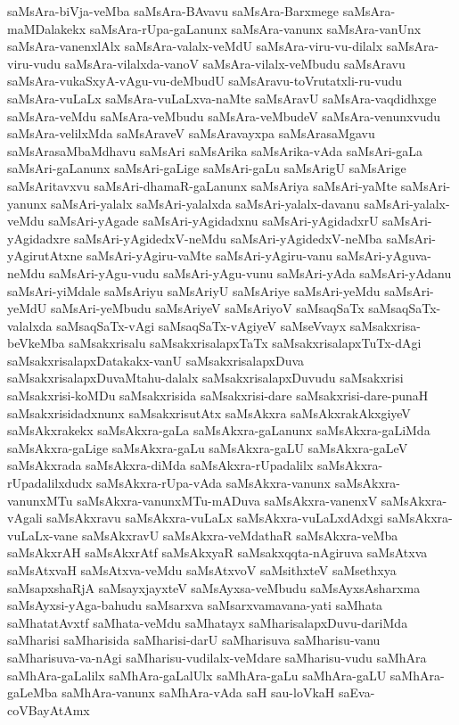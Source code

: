 {saMsAra-biVja-veMba
saMsAra-BAvavu
saMsAra-Barxmege
saMsAra-maMDalakekx
saMsAra-rUpa-gaLanunx
saMsAra-vanunx
saMsAra-vanUnx
saMsAra-vanenxlAlx
saMsAra-valalx-veMdU
saMsAra-viru-vu-dilalx
saMsAra-viru-vudu
saMsAra-vilalxda-vanoV
saMsAra-vilalx-veMbudu
saMsAravu
saMsAra-vukaSxyA-vAgu-vu-deMbudU
saMsAravu-toVrutatxli-ru-vudu
saMsAra-vuLaLx
saMsAra-vuLaLxva-naMte
saMsAravU
saMsAra-vaqdidhxge
saMsAra-veMdu
saMsAra-veMbudu
saMsAra-veMbudeV
saMsAra-venunxvudu
saMsAra-velilxMda
saMsAraveV
saMsAravayxpa
saMsArasaMgavu
saMsArasaMbaMdhavu
saMsAri
saMsArika
saMsArika-vAda
saMsAri-gaLa
saMsAri-gaLanunx
saMsAri-gaLige
saMsAri-gaLu
saMsArigU
saMsArige
saMsAritavxvu
saMsAri-dhamaR-gaLanunx
saMsAriya
saMsAri-yaMte
saMsAri-yanunx
saMsAri-yalalx
saMsAri-yalalxda
saMsAri-yalalx-davanu
saMsAri-yalalx-veMdu
saMsAri-yAgade
saMsAri-yAgidadxnu
saMsAri-yAgidadxrU
saMsAri-yAgidadxre
saMsAri-yAgidedxV-neMdu
saMsAri-yAgidedxV-neMba
saMsAri-yAgirutAtxne
saMsAri-yAgiru-vaMte
saMsAri-yAgiru-vanu
saMsAri-yAguva-neMdu
saMsAri-yAgu-vudu
saMsAri-yAgu-vunu
saMsAri-yAda
saMsAri-yAdanu
saMsAri-yiMdale
saMsAriyu
saMsAriyU
saMsAriye
saMsAri-yeMdu
saMsAri-yeMdU
saMsAri-yeMbudu
saMsAriyeV
saMsAriyoV
saMsaqSaTx
saMsaqSaTx-valalxda
saMsaqSaTx-vAgi
saMsaqSaTx-vAgiyeV
saMseVvayx
saMsakxrisa-beVkeMba
saMsakxrisalu
saMsakxrisalapxTaTx
saMsakxrisalapxTuTx-dAgi
saMsakxrisalapxDatakakx-vanU
saMsakxrisalapxDuva
saMsakxrisalapxDuvaMtahu-dalalx
saMsakxrisalapxDuvudu
saMsakxrisi
saMsakxrisi-koMDu
saMsakxrisida
saMsakxrisi-dare
saMsakxrisi-dare-punaH
saMsakxrisidadxnunx
saMsakxrisutAtx
saMsAkxra
saMsAkxrakAkxgiyeV
saMsAkxrakekx
saMsAkxra-gaLa
saMsAkxra-gaLanunx
saMsAkxra-gaLiMda
saMsAkxra-gaLige
saMsAkxra-gaLu
saMsAkxra-gaLU
saMsAkxra-gaLeV
saMsAkxrada
saMsAkxra-diMda
saMsAkxra-rUpadalilx
saMsAkxra-rUpadalilxdudx
saMsAkxra-rUpa-vAda
saMsAkxra-vanunx
saMsAkxra-vanunxMTu
saMsAkxra-vanunxMTu-mADuva
saMsAkxra-vanenxV
saMsAkxra-vAgali
saMsAkxravu
saMsAkxra-vuLaLx
saMsAkxra-vuLaLxdAdxgi
saMsAkxra-vuLaLx-vane
saMsAkxravU
saMsAkxra-veMdathaR
saMsAkxra-veMba
saMsAkxrAH
saMsAkxrAtf
saMsAkxyaR
saMsakxqqta-nAgiruva
saMsAtxva
saMsAtxvaH
saMsAtxva-veMdu
saMsAtxvoV
saMsithxteV
saMsethxya
saMsapxshaRjA
saMsayxjayxteV
saMsAyxsa-veMbudu
saMsAyxsAsharxma
saMsAyxsi-yAga-bahudu
saMsarxva
saMsarxvamavana-yati
saMhata
saMhatatAvxtf
saMhata-veMdu
saMhatayx
saMharisalapxDuvu-dariMda
saMharisi
saMharisida
saMharisi-darU
saMharisuva
saMharisu-vanu
saMharisuva-va-nAgi
saMharisu-vudilalx-veMdare
saMharisu-vudu
saMhAra
saMhAra-gaLalilx
saMhAra-gaLalUlx
saMhAra-gaLu
saMhAra-gaLU
saMhAra-gaLeMba
saMhAra-vanunx
saMhAra-vAda
saH
sau-loVkaH
saEva-coVBayAtAmx
}
